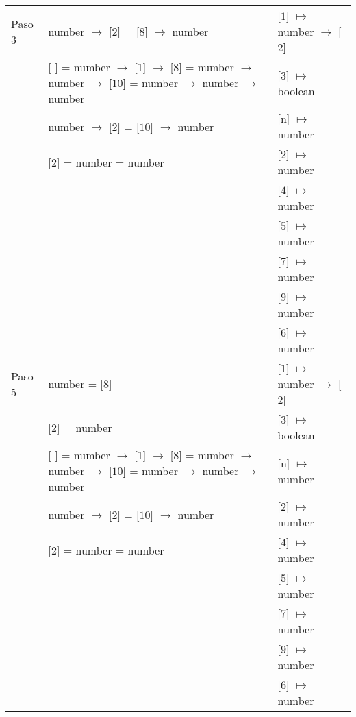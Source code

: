 \documentclass{article}
\begin{document}
\begin{center}
\begin{longtable}{ | l | p{10 cm} | p{5 cm} | }
 Paso 3  & number $\rightarrow$ [$\boxed{2}$] = [$\boxed{8}$] $\rightarrow$ number						& [$\boxed{1}$] $\mapsto$ number $\rightarrow$ [$\boxed{2}$]	\\
	 & [-] = number $\rightarrow$ [1] $\rightarrow$ [$\boxed{8}$] = number $\rightarrow$ number $\rightarrow$ [$\boxed{10}$] =
	   number $\rightarrow$ number $\rightarrow$ number									& [$\boxed{3}$] $\mapsto$ boolean	\\
	 & number $\rightarrow$ [$\boxed{2}$] = [$\boxed{10}$] $\rightarrow$ number	 					& [n] $\mapsto$ number	\\ 
	 & [$\boxed{2}$] = number = number											& [2] $\mapsto$ number	\\ 
	 &	& [$\boxed{4}$] $\mapsto$ number \\
	 &	& [$\boxed{5}$] $\mapsto$ number \\
	 &	& [$\boxed{7}$] $\mapsto$ number \\ 
	 &	& [$\boxed{9}$] $\mapsto$ number \\ 
	 &	& [$\boxed{6}$] $\mapsto$ number \\ \hline
	 
 Paso 5  & number = [$\boxed{8}$]						 						& [$\boxed{1}$] $\mapsto$ number $\rightarrow$ [$\boxed{2}$]	\\
	 & [$\boxed{2}$] = number												& [$\boxed{3}$] $\mapsto$ boolean \\
	 & [-] = number $\rightarrow$ [1] $\rightarrow$ [$\boxed{8}$] = number $\rightarrow$ number $\rightarrow$ [$\boxed{10}$] =
	   number $\rightarrow$ number $\rightarrow$ number									& [n] $\mapsto$ number	\\
	 & number $\rightarrow$ [$\boxed{2}$] = [$\boxed{10}$] $\rightarrow$ number	 					& [2] $\mapsto$ number	\\ 
	 & [$\boxed{2}$] = number = number											& [$\boxed{4}$] $\mapsto$ number	\\ 
	 &	& [$\boxed{5}$] $\mapsto$ number \\
	 &	& [$\boxed{7}$] $\mapsto$ number \\ 
	 &	& [$\boxed{9}$] $\mapsto$ number \\ 
	 &	& [$\boxed{6}$] $\mapsto$ number \\ \hline
 

\end{longtable}
\end{center}
\end{document}
